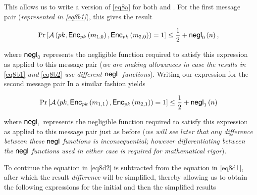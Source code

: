 \documentclass[../CryptoHW3.tex]{subfiles}
\begin{document}
\begin{flushleft}
This allows us to write a version of \ref{eq8a} for both \label{eq8b1} and \label{eq8b2}.  For the first message pair (\emph{represented in \ref{eq8b1}}), this gives the result

\begin{align}
  \Pr \left[ \mathcal{A} \left( pk,  \text{{\fontfamily{phv}\selectfont Enc}}_{pk} \left( m_{1, 0} \right), \text{{\fontfamily{phv}\selectfont Enc}}_{pk} \left( m_{2, 0} \right) \right) = 1 \right] \leq \frac{1}{2} + \text{{\fontfamily{phv}\selectfont negl}}_0 \left( n \right), \label{eq8d1}
\end{align}

where $\text{{\fontfamily{phv}\selectfont negl}}_0$ represents the negligible function required to satisfy this expression as applied to this message pair (\emph{we are making allowances in case the results in} \ref{eq8b1} \emph{and} \ref{eq8b2} \emph{use different} $\text{{\fontfamily{phv}\selectfont negl }}$ \emph{functions}).  Writing our expression for the second message pair In a similar fashion yields

\begin{align}
  \Pr \left[ \mathcal{A} \left( pk,  \text{{\fontfamily{phv}\selectfont Enc}}_{pk} \left( m_{1, 1} \right), \text{{\fontfamily{phv}\selectfont Enc}}_{pk} \left( m_{2, 1} \right) \right) = 1 \right] \leq \frac{1}{2} + \text{{\fontfamily{phv}\selectfont negl}}_1 \left( n \right) \label{eq8d2}
\end{align}

where $\text{{\fontfamily{phv}\selectfont negl}}_1$ represents the negligible function required to satisfy this expression as applied to this message pair just as before (\emph{we will see later that any difference between these} $\text{{\fontfamily{phv}\selectfont negl}}$ \emph{functions is inconsequential; however differentiating between the} $\text{{\fontfamily{phv}\selectfont negl}}$ \emph{functions used in either case is required for mathematical rigor}). \newline


To continue the equation in \ref{eq8d2} is subtracted from the equation in \ref{eq8d1}, after which the result \emph{difference} will be simplified, thereby allowing us to obtain the following expressions for the initial and then the simplified results  


\end{flushleft}
\end{document}
